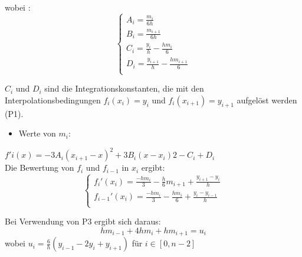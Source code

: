 {		
		wobei : 
		\begin{equation*}
			\begin{cases}
				A_i  = \frac{m_i}{6h} \\
				B_i = \frac{m_{i+1}}{6h} \\
				C_i = \frac{y_i}{h} - \frac{hm_i}{6} \\
				D_i = \frac{y_{i+1}}{h} - \frac{hm_{i+1}}{6} \\
			\end{cases}
		\end{equation*}
		
		\(C_i\) und \(D_i\) sind die Integrationskonstanten, die mit den Interpolationsbedingungen \(f_i(x_i)=y_i\) und \(f_i(x_{i+1})=y_{i+1}\) aufgelöst werden (P1).
		\begin{itemize}
			\item Werte von \(m_i\):
		\end{itemize}
		\(f'i(x)=−3A_i(x_{i+1}−x)^2+3B_i(x−x_i)2−C_i+D_i\) \\
		Die Bewertung von \(f_i\) und \(f_{i-1}\) in \(x_i\) ergibt:
		\begin{equation*}
			\begin{cases}
				f_i'(x_i)  = \frac{-hm_i}{3}-\frac{h}{6}m_{i+1}+\frac{y_{i+1}-y_i}{h} \\
				f_{i-1}'(x_i) = \frac{-hm_i}{3}-\frac{hm_i}{6}+\frac{y_{i}-y_{i-1}}{h}\\
			\end{cases}
		\end{equation*}
		
		Bei Verwendung von P3 ergibt sich daraus:
		\[hm_{i−1}+4hm_i+hm_{i+1}=u_i\]
		wobei \(u_i=\frac{6}{h}(y_{i-1}-2y_i+y_{i+1})\) für \(i \in [0 ,n-2]\)
		
		
}
